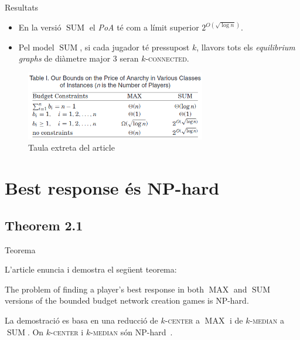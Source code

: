 \documentclass[aspectratio=169]{beamer}
\DeclareMathOperator{\SUM}{SUM}
\DeclareMathOperator{\MAX}{MAX}
\newcommand{\kcenter}{\texorpdfstring{$k$}{k}-\textsc{center}\xspace}
\newcommand{\kmedian}{\texorpdfstring{$k$}{k}-\textsc{median}\xspace}
\begin{document}
\begin{frame}{Resultats}
\begin{itemize}[<+->] 
    
    \item En la versió $\SUM$ el \emph{PoA} té com a límit superior $2^{O(\sqrt{\log n})}$.

    \vspace{1em}
    
    \item Pel model $\SUM$, si cada jugador té pressupost $k$, llavors tots els \emph{equilibrium graphs} de diàmetre major $3$ seran $k$-\textsc{connected}.
    
\end{itemize} 

    \begin{figure}
    \centering
    \includegraphics[width=0.7\textwidth]{Table1_PoA_Bounds}
    \caption{Taula extreta del article \cite{ehsani_bounded_2015}}
    \end{figure}
\end{frame}

\section{Best response és NP-hard}
\subsection{Theorem 2.1}
\begin{frame}{Teorema}

    L'article enuncia i demostra el següent teorema:
    
    \begin{theorem}
    The problem of finding a player's best response in both $\MAX$ and $\SUM$ versions of the bounded
    budget network creation games is NP-hard.
    \end{theorem}
    
    \vspace{2em}
    
    La demostració es basa en una reducció de \kcenter a $\MAX$ i de \kmedian a $\SUM$.
    On \kcenter i \kmedian són 
    NP-hard~\cite{hsu_easy_1979,lin_e-approximations_1992,megiddo_complexity_1984}.
    
\end{frame}
\end{document}
